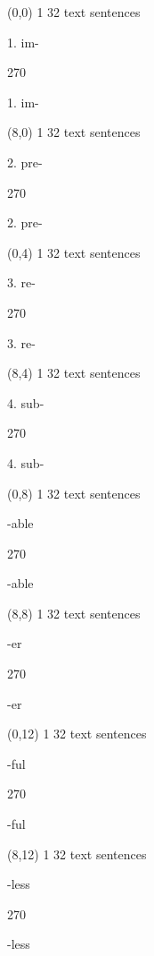 \documentclass[a4paper]{article}
\newenvironment{itemize*}%
{\begin{itemize}%
 \setlength{\itemsep}{0.5cm}%
 \setlength{\parsep}{0pt}%
 \setlength{\parskip}{0pt}}%
{\end{itemize}}
\newcommand{\mycard}[3]{%
	\small #1 #2
	\par
	\parbox[t][6.8cm][c]{9.5cm}{%
	\par
	\myleft{#3}
	\par
	\myright{#3}
	}
}
\newcommand{\myleft}[1]{%
	\begin{sideways}
	\hspace*{-0.9cm}
		\parbox[t][2.7cm][t]{6.5cm}{%
		\Huge #1
		}
	\end{sideways}
}
\newcommand{\myright}[1]{%
	\hspace*{6.5cm}
	\begin{turn}{270}
	\hspace*{-7.1cm}
		\parbox[t][2.7cm][t]{6.5cm}{%
		\Huge #1
		}
	\end{turn}
}
\begin{document}
\begin{textblock}{8}(0,0)
\mycard{1}{32 text sentences}{
\begin{itemize*}
\item 1. im-
\end{itemize*}
}
\end{textblock}

\begin{textblock}{8}(8,0)
\mycard{1}{32 text sentences}{
\begin{itemize*}
\item 2. pre-
\end{itemize*}
}
\end{textblock}

\begin{textblock}{8}(0,4)
\mycard{1}{32 text sentences}{
\begin{itemize*}
\item 3. re-
\end{itemize*}
}
\end{textblock}

\begin{textblock}{8}(8,4)
\mycard{1}{32 text sentences}{
\begin{itemize*}
\item 4. sub-
\end{itemize*}
}
\end{textblock}

\begin{textblock}{8}(0,8)
\mycard{1}{32 text sentences}{
\begin{itemize*}
\item -able
\end{itemize*}
}
\end{textblock}

\begin{textblock}{8}(8,8)
\mycard{1}{32 text sentences}{
\begin{itemize*}
\item -er
\end{itemize*}
}
\end{textblock}

\begin{textblock}{8}(0,12)
\mycard{1}{32 text sentences}{
\begin{itemize*}
\item -ful
\end{itemize*}
}
\end{textblock}

\begin{textblock}{8}(8,12)
\mycard{1}{32 text sentences}{
\begin{itemize*}
\item -less
\end{itemize*}
}
\end{textblock}

\null
\newpage
\end{document}
